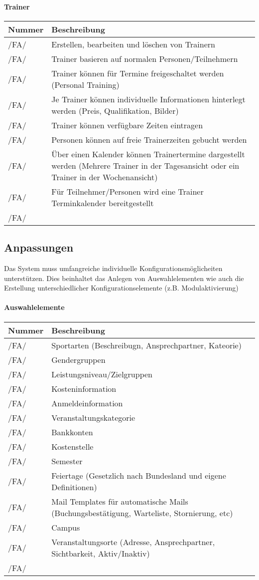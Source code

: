 \documentclass[a4paper,12pt]{article}
\newcommand\addrow[2]{#1 &#2\\ }
\newcommand\addheading[2]{#1 &#2\\ \hline}
\newcommand\tabularhead{\begin{tabular}{lp{13cm}}
\hline
}
\newenvironment{usecase}{\tabularhead}
{\hline\end{tabular}}
\begin{document}
\paragraph{\textbf{Trainer}\\}
\begin{usecase}
  \addheading{Nummer}{Beschreibung} 
  \addrow{/FA/}{Erstellen, bearbeiten und löschen von Trainern}
  \addrow{/FA/}{Trainer basieren auf normalen Personen/Teilnehmern}
  \addrow{/FA/}{Trainer können für Termine freigeschaltet werden (Personal Training)}
  \addrow{/FA/}{Je Trainer können individuelle Informationen hinterlegt werden (Preis, Qualifikation, Bilder)}
  \addrow{/FA/}{Trainer können verfügbare Zeiten eintragen}
  \addrow{/FA/}{Personen können auf freie Trainerzeiten gebucht werden}
  \addrow{/FA/}{Über einen Kalender können Trainertermine dargestellt werden (Mehrere Trainer in der Tagesansicht oder ein Trainer in der Wochenansicht)}
  \addrow{/FA/}{Für Teilnehmer/Personen wird eine Trainer Terminkalender bereitgestellt}
  \addrow{/FA/}{}
\end{usecase}



\subsection{Anpassungen}
Das System muss umfangreiche individuelle Konfigurationsmöglicheiten unterstützen. Dies beinhaltet das Anlegen von Auswahlelementen wie auch die Erstellung unterschiedlicher Konfigurationselemente (z.B. Modulaktivierung)
\paragraph{\textbf{Auswahlelemente}\\}

\begin{usecase}
  \addheading{Nummer}{Beschreibung} 
  \addrow{/FA/}{Sportarten (Beschreibugn, Ansprechpartner, Kateorie)}
  \addrow{/FA/}{Gendergruppen}
  \addrow{/FA/}{Leistungsniveau/Zielgruppen}
  \addrow{/FA/}{Kosteninformation}
  \addrow{/FA/}{Anmeldeinformation}
  \addrow{/FA/}{Veranstaltungskategorie}
  \addrow{/FA/}{Bankkonten}
  \addrow{/FA/}{Kostenstelle}
  \addrow{/FA/}{Semester}
  \addrow{/FA/}{Feiertage (Gesetzlich nach Bundesland und eigene Definitionen)}
  \addrow{/FA/}{Mail Templates für automatische Mails (Buchungsbestätigung, Warteliste, Stornierung, etc)}
  \addrow{/FA/}{Campus}
  \addrow{/FA/}{Veranstaltungsorte (Adresse, Ansprechpartner, Sichtbarkeit, Aktiv/Inaktiv)}
  \addrow{/FA/}{}
\end{usecase}
\end{document}
